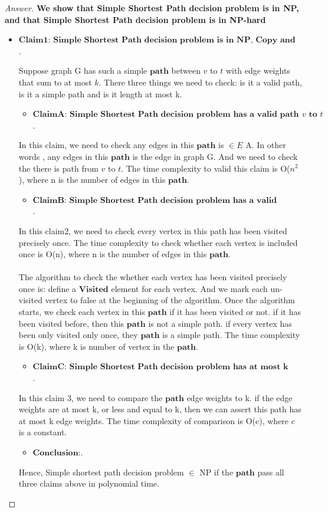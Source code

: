 \documentclass[11pt]{article}
\theoremstyle{definition}
\theoremstyle{definition}
\theoremstyle{definition}
\begin{document}
\begin{proof}[Answer]
\textbf{We show that Simple Shortest Path decision problem is in NP, and that Simple Shortest Path decision problem is in NP-hard}
\begin{itemize}
\item$\textbf{Claim1: Simple Shortest Path decision problem is in NP, Copy and Paste from Problem2}$.


Suppose graph G has such a simple $\textbf{path}$ between $v$ to $t$  with edge weights that sum to at most $k$. There three things we need to check: is it a valid path, is it a simple path and is it length at most k.\\

\begin{itemize}
\item$\textbf{ClaimA: Simple Shortest Path decision problem has a valid path from $v$ to $t$ }$.
\end{itemize}
In this claim, we need to check any edges in this $\textbf{path}$ is $\in E$ A. In other words , any edges in this $\textbf{path}$ is the edge in graph G. And we need to check the there is path from $v$ to $t$. The time complexity to valid this claim is O($n^2$), where n is the number of edges in this $\textbf{path}$.
\begin{itemize}
\item$\textbf{ClaimB: Simple Shortest Path decision problem has a valid Simple path}$.
\end{itemize}
In this claim2, we need to check every vertex in this path has been visited precisely once.   The time complexity to check whether each vertex is included once is O(n), where n is the number of edges in this $\textbf{path}$.\\
\\The algorithm to check the whether each vertex has been visited precisely once is: define a $\textbf{Visited}$ element for each vertex. And we mark each un-visited vertex to false at the beginning of the algorithm. Once the algorithm starts, we check each vertex in this $\textbf{path}$ if it has been visited or not. if it has been visited before, then this  $\textbf{path}$ is not a simple path. if every vertex has been only visited only once, they  $\textbf{path}$ is a simple path. The time complexity is O(k), where k is number of vertex  in the  $\textbf{path}$. 
\begin{itemize}
\item$\textbf{ClaimC: Simple Shortest Path decision problem has at most k edge weight}$.
\end{itemize}
In this claim 3, we need to compare the $\textbf{path}$ edge weights to k. if the edge weights are at most k, or less and equal to k, then we can assert this path has at most k edge weights. The time complexity of comparison is O(c), where c is a constant.
\begin{itemize}
\item$\textbf{Conclusion:}$.
\end{itemize}
Hence, Simple shortest path decision problem $\in$ NP if the $\textbf{path}$ pass all three claims above in polynomial time.



\end{itemize}
\end{proof}
\end{document}
